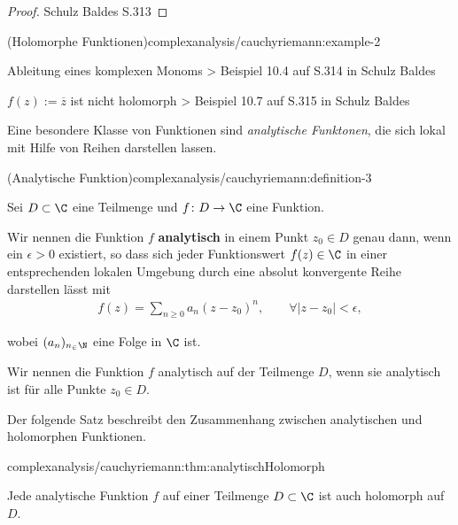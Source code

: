 \documentclass[letterpaper,10pt,german]{jupyterBook}
\begin{document}
\begin{proof}
 Schulz Baldes S.313
\end{proof}
\begin{example}{(Holomorphe Funktionen)}{complexanalysis/cauchyriemann:example-2}



\par
Ableitung eines komplexen Monoms  > Beispiel 10.4 auf S.314 in Schulz Baldes

\par
\(f(z) := \overline{z}\) ist nicht holomorph  > Beispiel 10.7 auf S.315 in Schulz Baldes
\end{example}

\par
Eine besondere Klasse von Funktionen sind \emph{analytische Funktonen}, die sich lokal mit Hilfe von Reihen darstellen lassen.
\begin{definition}{(Analytische Funktion)}{complexanalysis/cauchyriemann:definition-3}



\par
Sei \(D \subset \C\) eine Teilmenge und \(f \colon D \rightarrow \C\) eine Funktion.

\par
Wir nennen die Funktion \(f\) \textbf{analytisch} in einem Punkt \(z_0 \in D\) genau dann, wenn ein \(\epsilon > 0\) existiert, so dass sich jeder Funktionswert \(f(z) \in \C\) in einer entsprechenden lokalen Umgebung durch eine absolut konvergente Reihe darstellen lässt mit
\begin{align*}
f(z) = \sum_{n \geq 0} a_n (z-z_0)^n, \qquad \forall |z - z_0| < \epsilon,
\end{align*}
\par
wobei \((a_n)_{n_\in\N}\) eine Folge in \(\C\) ist.

\par
Wir nennen die Funktion \(f\) analytisch auf der Teilmenge \(D\), wenn sie analytisch ist für alle Punkte \(z_0 \in D\).
\end{definition}

\par
Der folgende Satz beschreibt den Zusammenhang zwischen analytischen und holomorphen Funktionen.
\begin{theorem}{}{complexanalysis/cauchyriemann:thm:analytischHolomorph}



\par
Jede analytische Funktion \(f\) auf einer Teilmenge \(D \subset \C\) ist auch holomorph auf \(D\).
\end{theorem}
\end{document}
